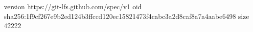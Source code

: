 version https://git-lfs.github.com/spec/v1
oid sha256:1f9cf267e9b2ed124b3ffccd120ec15821473f4cabc3a2d8caf8a7a4aabe6498
size 42222
